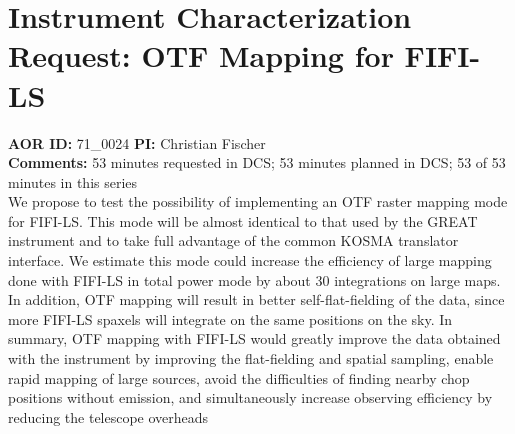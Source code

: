 \documentclass[10pt]{article}
\begin{document}
\section{Instrument Characterization Request: OTF Mapping for FIFI-LS}
{\large {\bf AOR ID:} 71\_0024 {\bf PI:} Christian Fischer}\\
{\bf Comments:}  53 minutes requested in DCS;  53 minutes planned in DCS;  53 of 53 minutes in this series\\
\newline
We propose to test the possibility of implementing an OTF raster mapping mode for FIFI-LS. This mode will be almost identical to that used by the GREAT instrument and to take full 
advantage of the common KOSMA translator interface. We estimate this mode could increase the efficiency of large mapping done with FIFI-LS in total power mode by about 30%
integrations on large maps. In addition, OTF mapping will result in better self-flat-fielding of the data, since more FIFI-LS spaxels will integrate on the same positions on the sky. In 
summary, OTF mapping with FIFI-LS would greatly improve the data obtained with the instrument by improving the flat-fielding and spatial sampling, enable rapid mapping of large sources, avoid the difficulties of finding nearby chop positions without emission, and simultaneously increase observing efficiency by reducing the telescope overheads
\end{document}
